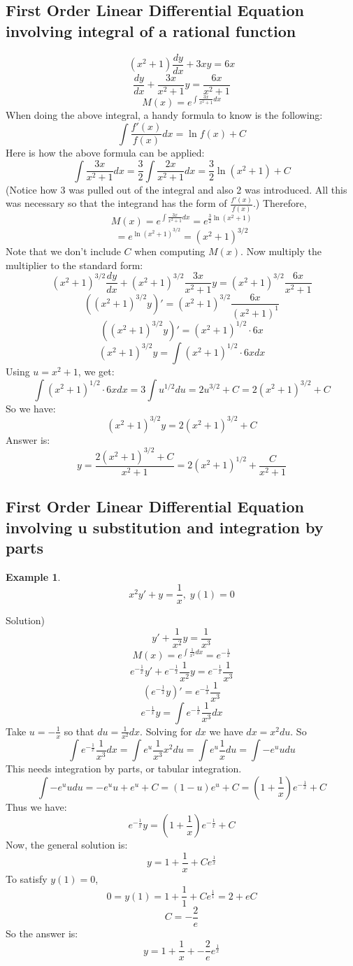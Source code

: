 \documentclass[12pt]{report}
\newtheorem{ex}{Example}[section]
\begin{document}
\subsection*{First Order Linear Differential Equation involving integral of a rational function}
$$(x^2+1) \frac{dy}{dx} + 3xy = 6x $$
$$ \frac{dy}{dx} + \frac{3x}{x^2+1} y = \frac{6x}{x^2+1} $$
$$M(x) = e^{\int \frac{3x}{x^2+1} dx} $$
When doing the above integral, a handy formula to know is the following:
$$\int \frac{f'(x)}{f(x)} dx = \ln f(x) +C $$
Here is how the above formula can be applied:
$$\int \frac{3x}{x^2+1} dx = \frac{3}{2}\int \frac{2x}{x^2+1} dx = \frac{3}{2} \ln {(x^2+1)} +C $$
(Notice how 3 was pulled out of the integral and also 2 was introduced. All this was necessary so that the integrand has the form of $\frac{f'(x)}{f(x)} $.)
Therefore,
$$M(x) = e^{\int \frac{3x}{x^2+1} dx} = e^{\frac{3}{2} \ln {(x^2+1)}}$$
$$ = e^{\ln {(x^2+1)^{3/2}}} = (x^2+1)^{3/2}$$
Note that we don't include $C$ when computing $M(x)$. Now multiply the multiplier to the standard form:
$$ (x^2+1)^{3/2}\frac{dy}{dx} + (x^2+1)^{3/2}\frac{3x}{x^2+1} y = (x^2+1)^{3/2}\frac{6x}{x^2+1} $$
$$ \left((x^2+1)^{3/2}y \right)'= (x^2+1)^{3/2}\frac{6x}{(x^2+1)^1} $$
$$ \left((x^2+1)^{3/2}y \right)'= (x^2+1)^{1/2}\cdot 6x $$
$$ (x^2+1)^{3/2}y = \int (x^2+1)^{1/2}\cdot 6x dx $$
Using $u=x^2+1$, we get:
$$\int (x^2+1)^{1/2}\cdot 6x dx =3\int u^{1/2} du = 2 u^{3/2} +C = 2(x^2+1)^{3/2}+C$$
So we have:
$$ (x^2+1)^{3/2}y = 2(x^2+1)^{3/2}+C $$
Answer is:
$$y = \frac{2(x^2+1)^{3/2}+C}{x^2+1} = 2(x^2+1)^{1/2}+\frac{C}{x^2+1}$$

\subsection*{First Order Linear Differential Equation involving u substitution and integration by parts}
\begin{ex}
$$ x^2 y' + y = \frac{1}{x}, \; y(1)=0 $$
\end{ex}
Solution)
$$ y' + \frac{1}{x^2} y = \frac{1}{x^3} $$
$$ M(x) = e^{\int \frac{1}{x^2} dx} = e^{-\frac{1}{x}}$$
$$ e^{-\frac{1}{x}}y' + e^{-\frac{1}{x}}\frac{1}{x^2} y = e^{-\frac{1}{x}}\frac{1}{x^3} $$
$$ \left(e^{-\frac{1}{x}}y\right)' = e^{-\frac{1}{x}}\frac{1}{x^3} $$
$$ e^{-\frac{1}{x}}y = \int e^{-\frac{1}{x}}\frac{1}{x^3} dx$$
Take $u= -\frac{1}{x}$ so that $du = \frac{1}{x^2} dx$. Solving for $dx$ we have $dx = x^2 du$. So
$$\int e^{-\frac{1}{x}}\frac{1}{x^3} dx = \int e^u \frac{1}{x^3} x^2 du = \int e^u \frac{1}{x} du= \int -e^u u du$$
This needs integration by parts, or tabular integration.
$$\int -e^u u du = -e^u u + e^u +C =(1-u)e^u +C = (1+\frac{1}{x})e^{-\frac{1}{x}}+C$$
Thus we have:
$$ e^{-\frac{1}{x}}y = \left(1+\frac{1}{x}\right)e^{-\frac{1}{x}}+C$$
Now, the general solution is:
$$ y = 1+\frac{1}{x}+ C e^{\frac{1}{x}} $$
To satisfy $y(1)=0 $,
$$0 = y(1) = 1+\frac{1}{1}+ C e^{\frac{1}{1}}=2+ eC$$
$$C=-\frac{2}{e}$$
So the answer is:
$$ y = 1+\frac{1}{x}+ -\frac{2}{e} e^{\frac{1}{x}} $$
\end{document}
